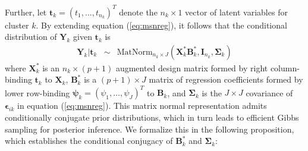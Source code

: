 \documentclass[useAMS,usenatbib,referee]{biom}
\begin{document}
Further, let $\mathbf{t}_{k} = (t_1,...,t_{n_k})^T$ denote the $n_k\times 1$ vector of latent variables for cluster $k$. By extending equation (\ref{eq:msnreg}), it follows that the conditional distribution of $\mathbf{Y}_k$ given $\mathbf{t}_{k}$ is
\begin{eqnarray}
\label{eq:matnormal}
\mathbf{Y}_k | \mathbf{t}_k &\sim& \text{MatNorm}_{n_k \times J}(\mathbf{X}^*_k\mathbf{B}^*_k, \mathbf{I}_{n_k}, \boldsymbol\Sigma_k)
\end{eqnarray}
where $\mathbf{X}^*_k$ is an $n_k \times (p+1)$ augmented design matrix formed by right column-binding $\mathbf{t}_{k}$ to $\mathbf{X}_k$, $\mathbf{B}^*_k$ is a $(p+1)\times J$ matrix of regression coefficients formed by lower row-binding $\boldsymbol\psi_k=(\psi_1,\ldots,\psi_J)^T$ to $\mathbf{B}_k$, and $\boldsymbol\Sigma_k$ is the $J\times J$ covariance of $\boldsymbol\epsilon_{ik}$ in equation (\ref{eq:msnreg}). This matrix normal representation admits conditionally conjugate prior distributions, which in turn leads to efficient Gibbs sampling for posterior inference. We formalize this in the following proposition, which establishes the conditional conjugacy of $\mathbf{B}^*_k$ and $\boldsymbol\Sigma_k$:
\end{document}
